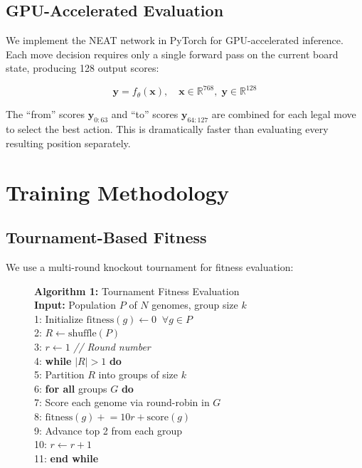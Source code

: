 \documentclass[11pt, twocolumn]{article}
\begin{document}
\subsection{GPU-Accelerated Evaluation}
We implement the NEAT network in PyTorch for GPU-accelerated inference. Each move decision requires only a single forward pass on the current board state, producing 128 output scores:

\begin{equation}
    \mathbf{y} = f_\theta(\mathbf{x}), \quad \mathbf{x} \in \mathbb{R}^{768}, \; \mathbf{y} \in \mathbb{R}^{128}
\end{equation}

The ``from'' scores $\mathbf{y}_{0{:}63}$ and ``to'' scores $\mathbf{y}_{64{:}127}$ are combined for each legal move to select the best action. This is dramatically faster than evaluating every resulting position separately.

\section{Training Methodology}
\label{sec:training}

\subsection{Tournament-Based Fitness}
We use a multi-round knockout tournament for fitness evaluation:

\begin{figure}[H]
\begin{framed}
\small
\textbf{Algorithm 1:} Tournament Fitness Evaluation\\[0.3em]
\textbf{Input:} Population $P$ of $N$ genomes, group size $k$\\[0.2em]
1: Initialize $\text{fitness}(g) \gets 0 \;\; \forall g \in P$\\
2: $R \gets \text{shuffle}(P)$\\
3: $r \gets 1$  \hfill \textit{// Round number}\\
4: \textbf{while} $|R| > 1$ \textbf{do}\\
5: \quad Partition $R$ into groups of size $k$\\
6: \quad \textbf{for all} groups $G$ \textbf{do}\\
7: \quad\quad Score each genome via round-robin in $G$\\
8: \quad\quad $\text{fitness}(g) \mathrel{+}= 10r + \text{score}(g)$\\
9: \quad\quad Advance top 2 from each group\\
10: \quad $r \gets r + 1$\\
11: \textbf{end while}
\end{framed}
\label{alg:tournament}
\end{figure}
\end{document}
